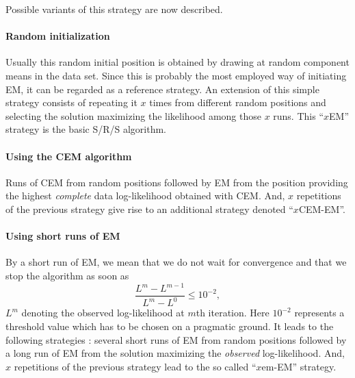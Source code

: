 \documentclass[12pt]{article}
\begin{document}
Possible variants of this strategy are now described.
\paragraph{Random initialization} Usually this random initial position is obtained by drawing
at random component means in the data set. Since this is probably the most employed way of
initiating EM, it can be regarded as a reference strategy. An extension of this simple strategy
consists of repeating it $x$ times from different random positions and selecting the solution
maximizing the likelihood among those $x$ runs. This ``$x$EM'' strategy is the basic S/R/S
algorithm.

\paragraph{Using the CEM algorithm}
Runs of CEM from random positions followed by EM from the position providing the highest {\it
  complete} data log-likelihood obtained with CEM. And, $x$ repetitions of the previous
strategy give rise to an additional strategy denoted ``$x$CEM-EM''.

\paragraph{Using short runs of EM}
By a short run of EM, we mean that we do not wait for convergence and that we stop the
algorithm as soon as
\begin{equation} \label{seuil}
  \frac{L^m-L^{m-1}}{L^m-L^0} \leq 10^{-2},
\end{equation}
$L^m$ denoting the observed log-likelihood at $m$th iteration.  Here $10^{-2}$ represents a
threshold value which has to be chosen on a pragmatic ground. It leads to the following
strategies : several short runs of EM from random positions followed by a long run of EM from
the solution maximizing the {\it observed} log-likelihood. And, $x$ repetitions of the previous
strategy lead to the so called ``$x$em-EM'' strategy.
\end{document}
